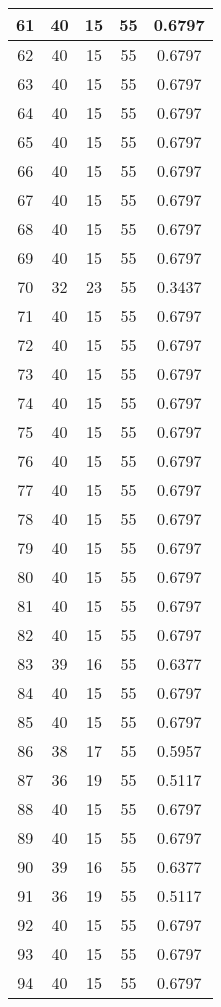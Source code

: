 \documentclass[letterpaper, 12pt]{article}
\begin{document}
\begin{longtable}{|c|c|c|c|c|}
\hline
61 & 40 & 15 & 55 & 0.6797 \\
\hline
62 & 40 & 15 & 55 & 0.6797 \\
\hline
63 & 40 & 15 & 55 & 0.6797 \\
\hline
64 & 40 & 15 & 55 & 0.6797 \\
\hline
65 & 40 & 15 & 55 & 0.6797 \\
\hline
66 & 40 & 15 & 55 & 0.6797 \\
\hline
67 & 40 & 15 & 55 & 0.6797 \\
\hline
68 & 40 & 15 & 55 & 0.6797 \\
\hline
69 & 40 & 15 & 55 & 0.6797 \\
\hline
70 & 32 & 23 & 55 & 0.3437 \\
\hline
71 & 40 & 15 & 55 & 0.6797 \\
\hline
72 & 40 & 15 & 55 & 0.6797 \\
\hline
73 & 40 & 15 & 55 & 0.6797 \\
\hline
74 & 40 & 15 & 55 & 0.6797 \\
\hline
75 & 40 & 15 & 55 & 0.6797 \\
\hline
76 & 40 & 15 & 55 & 0.6797 \\
\hline
77 & 40 & 15 & 55 & 0.6797 \\
\hline
78 & 40 & 15 & 55 & 0.6797 \\
\hline
79 & 40 & 15 & 55 & 0.6797 \\
\hline
80 & 40 & 15 & 55 & 0.6797 \\
\hline
81 & 40 & 15 & 55 & 0.6797 \\
\hline
82 & 40 & 15 & 55 & 0.6797 \\
\hline
83 & 39 & 16 & 55 & 0.6377 \\
\hline
84 & 40 & 15 & 55 & 0.6797 \\
\hline
85 & 40 & 15 & 55 & 0.6797 \\
\hline
86 & 38 & 17 & 55 & 0.5957 \\
\hline
87 & 36 & 19 & 55 & 0.5117 \\
\hline
88 & 40 & 15 & 55 & 0.6797 \\
\hline
89 & 40 & 15 & 55 & 0.6797 \\
\hline
90 & 39 & 16 & 55 & 0.6377 \\
\hline
91 & 36 & 19 & 55 & 0.5117 \\
\hline
92 & 40 & 15 & 55 & 0.6797 \\
\hline
93 & 40 & 15 & 55 & 0.6797 \\
\hline
94 & 40 & 15 & 55 & 0.6797 \\

\end{longtable}
\end{document}
